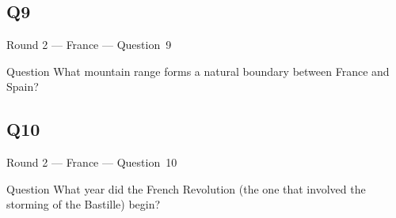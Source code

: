 \documentclass[11pt]{beamer}
\begin{document}
\subsection*{Q9}
\begin{frame}[t]{Round 2 --- France --- \mbox{Question 9}}
\begin{block}{Question}
What mountain range forms a natural boundary between France and Spain?
\end{block}
\end{frame}
\subsection*{Q10}
\begin{frame}[t]{Round 2 --- France --- \mbox{Question 10}}
\begin{block}{Question}
What year did the French Revolution (the one that involved the storming of the Bastille) begin?
\end{block}
\end{frame}
\end{document}
